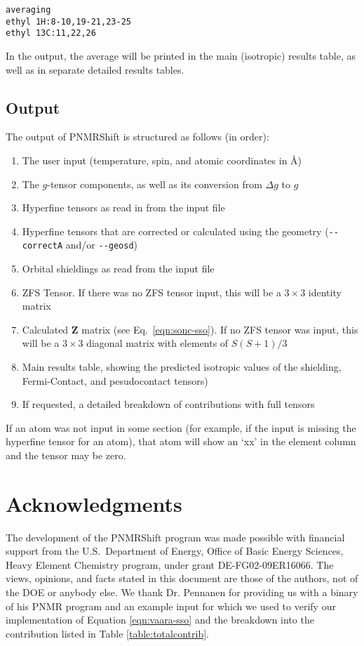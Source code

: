 \documentclass[11pt]{report}
\newcommand\PNMRShift{\textsf{PNMRShift}\xspace}
\newcommand{\code}[1]{\lstinline!#1!}
\newcommand{\matdim}[2]{\ensuremath{#1 \times #2}}
\newcommand{\ten}{\bm}
\begin{document}
\begin{lstlisting}[language={}]
averaging
ethyl 1H:8-10,19-21,23-25
ethyl 13C:11,22,26
\end{lstlisting}

In the output, the average will be printed in the main (isotropic)
results table, as well as in separate detailed results tables.

\section{Output}
\label{sec:output}
The output of \PNMRShift is structured as follows (in order):
%
\begin{enumerate}
\item{The user input (temperature, spin, and atomic coordinates in \AA)}
\item{The $g$-tensor components, as well as its conversion from $\Delta g$ to $g$}
\item{Hyperfine tensors as read in from the input file}
\item{Hyperfine tensors that are corrected or calculated using the geometry (\code{--correctA} and/or \code{--geosd})}
\item{Orbital shieldings as read from the input file}
\item{ZFS Tensor. If there was no ZFS tensor input, this will be a \matdim{3}{3} identity matrix}
\item{Calculated $\ten{Z}$ matrix (see Eq.~\ref{eqn:sonc-sso}). If no ZFS tensor was input, this
will be a \matdim{3}{3} diagonal matrix with elements of $S(S+1)/3$}
\item{Main results table, showing the predicted isotropic values of the shielding, Fermi-Contact, and pesudocontact
tensors)}
\item{If requested, a detailed breakdown of contributions with full tensors}

\end{enumerate}

If an atom was not input in some section (for example, if the input is
missing the hyperfine tensor for an atom), that atom will show an `xx'
in the element column and the tensor may be zero.

\chapter*{Acknowledgments}

The development of the \PNMRShift program was made possible with
financial support from the U.S.\ Department of Energy, Office of Basic
Energy Sciences, Heavy Element Chemistry program, under grant
DE-FG02-09ER16066. The views, opinions, and facts stated in this
document are those of the authors, not of the DOE or anybody else. We
thank Dr. Pennanen for providing us with a binary of his PNMR program
and an example input for  which we used to verify our
implementation of Equation \ref{eqn:vaara-sso} and the breakdown into
the contribution listed in Table \ref{table:totalcontrib}.
\end{document}
